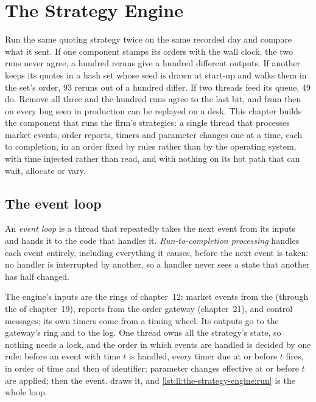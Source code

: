 \chapter{The Strategy Engine}\label{ch:ll:the-strategy-engine}

Run the same quoting strategy twice on the same recorded day and compare what it sent. If one component stamps its orders
with the wall clock, the two runs never agree, a hundred reruns give a hundred different outputs. If another keeps its quotes
in a hash set whose seed is drawn at start-up and walks them in the set's order, 93 reruns out of a hundred differ. If two
threads feed its queue, 49 do. Remove all three and the hundred runs agree to the last bit, and from then on every bug seen in
production can be replayed on a desk. This chapter builds the component that runs the firm's strategies: a single thread
that processes market events, order reports, timers and parameter changes one at a time, each to completion, in an order
fixed by rules rather than by the operating system, with time injected rather than read, and with nothing on its hot path that
can wait, allocate or vary.

\section{The event loop}

\begin{definition}\label{def:ll:the-strategy-engine:loop}
An \emph{event loop} is a thread that repeatedly takes the next event from its inputs and hands it to the code
that handles it. \emph{Run-to-completion processing} handles each event entirely, including
everything it causes, before the next event is taken: no handler is interrupted by another, so a handler never sees a state
that another has half changed.
\end{definition}

The engine's inputs are the rings of chapter~12: market events from the  (through the  of
chapter~19), reports from the order gateway (chapter~21), and control messages; its own timers come from a timing wheel. Its
outputs go to the gateway's ring and to the log. One thread owns all the strategy's state, so nothing needs a lock, and the
order in which events are handled is decided by one rule: before an event with time $t$ is handled, every timer due at or
before $t$ fires, in order of time and then of identifier; parameter changes effective at or before $t$ are applied; then the
event.  draws it, and \cref{lst:ll:the-strategy-engine:run} is the whole loop.

